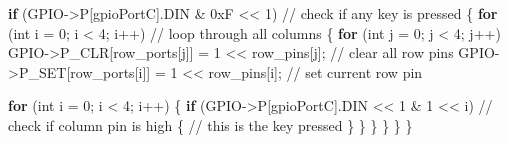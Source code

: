 \documentclass[
  9pt,
  letterpaper,
  abstract,
  titlepage]{scrbook}
\newenvironment{Shaded}{\begin{snugshade}}{\end{snugshade}}
\newcommand{\BaseNTok}[1]{\textcolor[rgb]{0.68,0.00,0.00}{#1}}
\newcommand{\CommentTok}[1]{\textcolor[rgb]{0.37,0.37,0.37}{#1}}
\newcommand{\ControlFlowTok}[1]{\textcolor[rgb]{0.00,0.23,0.31}{\textbf{#1}}}
\newcommand{\DataTypeTok}[1]{\textcolor[rgb]{0.68,0.00,0.00}{#1}}
\newcommand{\DecValTok}[1]{\textcolor[rgb]{0.68,0.00,0.00}{#1}}
\newcommand{\NormalTok}[1]{\textcolor[rgb]{0.00,0.23,0.31}{#1}}
\newcommand{\OperatorTok}[1]{\textcolor[rgb]{0.37,0.37,0.37}{#1}}
\begin{document}
\begin{Shaded}
\begin{Highlighting}[]
        \ControlFlowTok{if} \OperatorTok{(}\NormalTok{GPIO}\OperatorTok{{-}\textgreater{}}\NormalTok{P}\OperatorTok{[}\NormalTok{gpioPortC}\OperatorTok{].}\NormalTok{DIN }\OperatorTok{\&} \BaseNTok{0xF} \OperatorTok{\textless{}\textless{}} \DecValTok{1}\OperatorTok{)} \CommentTok{// check if any key is pressed}
        \OperatorTok{\{}
            \ControlFlowTok{for} \OperatorTok{(}\DataTypeTok{int}\NormalTok{ i }\OperatorTok{=} \DecValTok{0}\OperatorTok{;}\NormalTok{ i }\OperatorTok{\textless{}} \DecValTok{4}\OperatorTok{;}\NormalTok{ i}\OperatorTok{++)} \CommentTok{// loop through all columns}
            \OperatorTok{\{}
                \ControlFlowTok{for} \OperatorTok{(}\DataTypeTok{int}\NormalTok{ j }\OperatorTok{=} \DecValTok{0}\OperatorTok{;}\NormalTok{ j }\OperatorTok{\textless{}} \DecValTok{4}\OperatorTok{;}\NormalTok{ j}\OperatorTok{++)}
\NormalTok{                    GPIO}\OperatorTok{{-}\textgreater{}}\NormalTok{P\_CLR}\OperatorTok{[}\NormalTok{row\_ports}\OperatorTok{[}\NormalTok{j}\OperatorTok{]]} \OperatorTok{=} \DecValTok{1} \OperatorTok{\textless{}\textless{}}\NormalTok{ row\_pins}\OperatorTok{[}\NormalTok{j}\OperatorTok{];} \CommentTok{// clear all row pins}
\NormalTok{                GPIO}\OperatorTok{{-}\textgreater{}}\NormalTok{P\_SET}\OperatorTok{[}\NormalTok{row\_ports}\OperatorTok{[}\NormalTok{i}\OperatorTok{]]} \OperatorTok{=} \DecValTok{1} \OperatorTok{\textless{}\textless{}}\NormalTok{ row\_pins}\OperatorTok{[}\NormalTok{i}\OperatorTok{];}     \CommentTok{// set current row pin}

                \ControlFlowTok{for} \OperatorTok{(}\DataTypeTok{int}\NormalTok{ i }\OperatorTok{=} \DecValTok{0}\OperatorTok{;}\NormalTok{ i }\OperatorTok{\textless{}} \DecValTok{4}\OperatorTok{;}\NormalTok{ i}\OperatorTok{++)}
                \OperatorTok{\{}
                    \ControlFlowTok{if} \OperatorTok{(}\NormalTok{GPIO}\OperatorTok{{-}\textgreater{}}\NormalTok{P}\OperatorTok{[}\NormalTok{gpioPortC}\OperatorTok{].}\NormalTok{DIN }\OperatorTok{\textless{}\textless{}} \DecValTok{1} \OperatorTok{\&} \DecValTok{1} \OperatorTok{\textless{}\textless{}}\NormalTok{ i}\OperatorTok{)} \CommentTok{// check if column pin is high}
                    \OperatorTok{\{}
                        \CommentTok{// this is the key pressed}
                    \OperatorTok{\}}
                \OperatorTok{\}}
            \OperatorTok{\}}
        \OperatorTok{\}}
    \OperatorTok{\}}
\OperatorTok{\}}
\end{Highlighting}
\end{Shaded}
\end{document}
